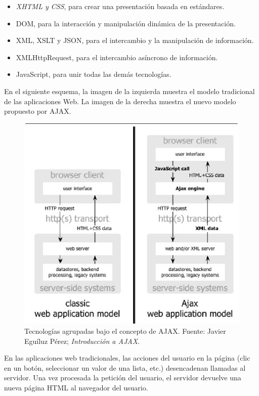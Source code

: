 \begin{itemize}
\item \textsl{XHTML y CSS}, para crear una presentaci\'on basada en est\'andares.
\item DOM, para la interacci\'on y manipulaci\'on din\'amica de la presentaci\'on.
\item XML, XSLT y JSON, para el intercambio y la manipulaci\'on de informaci\'on.
\item XMLHttpRequest, para el intercambio as\'incrono de informaci\'on.
\item JavaScript, para unir todas las dem\'as tecnolog\'ias.
\end{itemize}

En el siguiente esquema, la imagen de la izquierda muestra el modelo tradicional de las aplicaciones Web. La imagen de la derecha muestra el nuevo modelo propuesto por AJAX.\\

\begin{figure}[h]
\centering
\includegraphics[scale=.7, keepaspectratio=true]{imagenes/02_imagen.png}
\caption{Tecnolog\'ias agrupadas bajo el concepto de AJAX. Fuente: Javier Egu\'iluz P\'erez; \textit{Introducci\'on a AJAX}.}
\end{figure}

En las aplicaciones web tradicionales, las acciones del usuario en la p\'agina (clic en un bot\'on, seleccionar un valor de una lista, etc.) desencadenan llamadas al servidor. Una vez procesada la petici\'on del usuario, el servidor devuelve una nueva p\'agina HTML al navegador del usuario.\\

